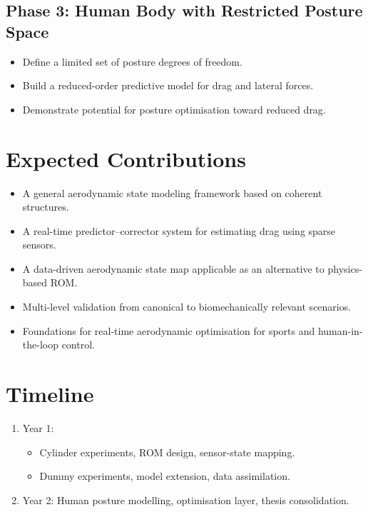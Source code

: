 \documentclass[12pt]{article}
\begin{document}
\subsection{Phase 3: Human Body with Restricted Posture Space}
\begin{itemize}
    \item Define a limited set of posture degrees of freedom.
    \item Build a reduced-order predictive model for drag and lateral forces.
    \item Demonstrate potential for posture optimisation toward reduced drag.
\end{itemize}

\section{Expected Contributions}
\begin{itemize}
    \item A general aerodynamic state modeling framework based on coherent structures.
    \item A real-time predictor--corrector system for estimating drag using sparse sensors.
    \item A data-driven aerodynamic state map applicable as an alternative to physics-based ROM.
    \item Multi-level validation from canonical to biomechanically relevant scenarios.
    \item Foundations for real-time aerodynamic optimisation for sports and human-in-the-loop control.
\end{itemize}

\section{Timeline}
\begin{enumerate}
    \item Year 1: \begin{itemize}
                        \item Cylinder experiments, ROM design, sensor-state mapping.
                        \item Dummy experiments, model extension, data assimilation.
                    \end{itemize}
    \item Year 2: Human posture modelling, optimisation layer, thesis consolidation.
\end{enumerate}
\end{document}
